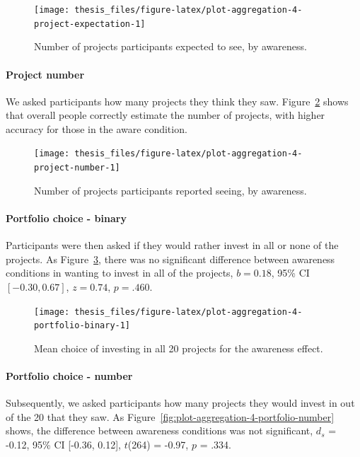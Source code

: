 \documentclass[a4paper, nobind, dvipsnames]{templates/ociamthesis}
\theoremstyle{definition}
\theoremstyle{definition}
\theoremstyle{definition}
\theoremstyle{definition}
\theoremstyle{remark}
\begin{document}
\begin{figure}
\texttt{[image: thesis\_files/figure-latex/plot-aggregation-4-project-expectation-1]} \caption{Number of projects participants expected to see, by awareness.}\label{fig:plot-aggregation-4-project-expectation}
\end{figure}

\paragraph{Project number}

We asked participants how many projects they think they saw.
Figure~\ref{fig:plot-aggregation-4-project-number} shows that overall people
correctly estimate the number of projects, with higher accuracy for those in the
aware condition.



\begin{figure}
\texttt{[image: thesis\_files/figure-latex/plot-aggregation-4-project-number-1]} \caption{Number of projects participants reported seeing, by awareness.}\label{fig:plot-aggregation-4-project-number}
\end{figure}

\paragraph{Portfolio choice - binary}

Participants were then asked if they would rather invest in all or none of the
projects. As Figure~\ref{fig:plot-aggregation-4-portfolio-binary}, there was no
significant difference between awareness conditions in wanting to invest
in all of the projects,
\(b = 0.18\), 95\% CI \([-0.30, 0.67]\), \(z = 0.74\), \(p = .460\).



\begin{figure}
\texttt{[image: thesis\_files/figure-latex/plot-aggregation-4-portfolio-binary-1]} \caption{Mean choice of investing in all 20 projects for the awareness effect.}\label{fig:plot-aggregation-4-portfolio-binary}
\end{figure}

\paragraph{Portfolio choice - number}

Subsequently, we asked participants how many projects they would invest in out
of the 20 that they saw. As
Figure~\ref{fig:plot-aggregation-4-portfolio-number} shows, the difference
between awareness conditions was not significant,
\(d_s\) = -0.12, 95\% CI {[}-0.36, 0.12{]}, \(t\)(264) = -0.97, \(p\) = .334.
\end{document}
